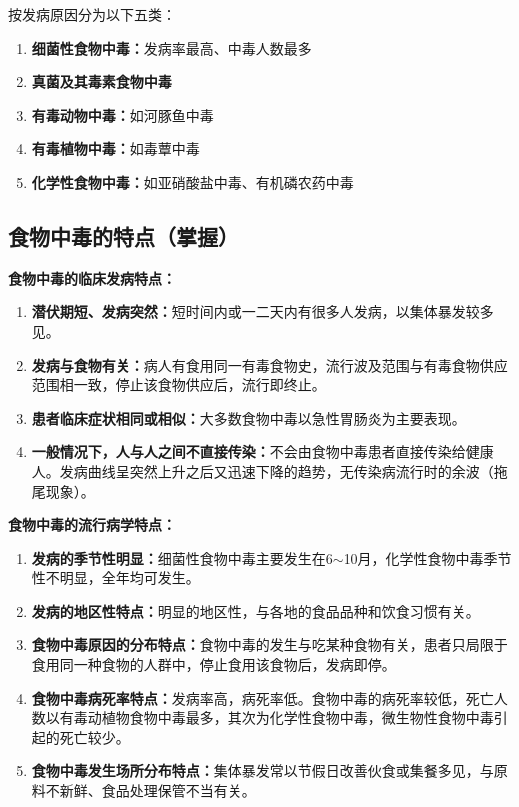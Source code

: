 按发病原因分为以下五类：
\begin{enumerate}[leftmargin=*]
    \item \textbf{细菌性食物中毒：}发病率最高、中毒人数最多
    \item \textbf{真菌及其毒素食物中毒}
    \item \textbf{有毒动物中毒：}如河豚鱼中毒
    \item \textbf{有毒植物中毒：}如毒蕈中毒
    \item \textbf{化学性食物中毒：}如亚硝酸盐中毒、有机磷农药中毒
\end{enumerate}

\subsection{食物中毒的特点（掌握）}

\begin{keybox}
\textbf{食物中毒的临床发病特点：}
\begin{enumerate}[leftmargin=*]
    \item \textbf{潜伏期短、发病突然：}短时间内或一二天内有很多人发病，以集体暴发较多见。
    \item \textbf{发病与食物有关：}病人有食用同一有毒食物史，流行波及范围与有毒食物供应范围相一致，停止该食物供应后，流行即终止。
    \item \textbf{患者临床症状相同或相似：}大多数食物中毒以急性胃肠炎为主要表现。
    \item \textbf{一般情况下，人与人之间不直接传染：}不会由食物中毒患者直接传染给健康人。发病曲线呈突然上升之后又迅速下降的趋势，无传染病流行时的余波（拖尾现象）。
\end{enumerate}
\end{keybox}

\begin{keybox}
\textbf{食物中毒的流行病学特点：}
\begin{enumerate}[leftmargin=*]
    \item \textbf{发病的季节性明显：}细菌性食物中毒主要发生在6$\sim$10月，化学性食物中毒季节性不明显，全年均可发生。
    \item \textbf{发病的地区性特点：}明显的地区性，与各地的食品品种和饮食习惯有关。
    \item \textbf{食物中毒原因的分布特点：}食物中毒的发生与吃某种食物有关，患者只局限于食用同一种食物的人群中，停止食用该食物后，发病即停。
    \item \textbf{食物中毒病死率特点：}发病率高，病死率低。食物中毒的病死率较低，死亡人数以有毒动植物食物中毒最多，其次为化学性食物中毒，微生物性食物中毒引起的死亡较少。
    \item \textbf{食物中毒发生场所分布特点：}集体暴发常以节假日改善伙食或集餐多见，与原料不新鲜、食品处理保管不当有关。
\end{enumerate}
\end{keybox}

